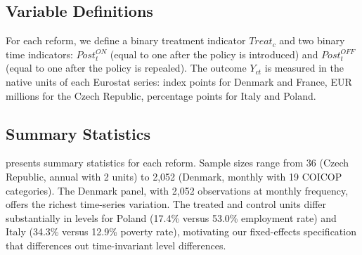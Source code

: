 \documentclass[12pt]{article}
\begin{document}
\subsection{Variable Definitions}

For each reform, we define a binary treatment indicator $Treat_c$ and two binary time indicators: $Post^{ON}_t$ (equal to one after the policy is introduced) and $Post^{OFF}_t$ (equal to one after the policy is repealed). The outcome $Y_{ct}$ is measured in the native units of each Eurostat series: index points for Denmark and France, EUR millions for the Czech Republic, percentage points for Italy and Poland.

\subsection{Summary Statistics}

 presents summary statistics for each reform. Sample sizes range from 36 (Czech Republic, annual with 2 units) to 2,052 (Denmark, monthly with 19 COICOP categories). The Denmark panel, with 2,052 observations at monthly frequency, offers the richest time-series variation. The treated and control units differ substantially in levels for Poland (17.4\% versus 53.0\% employment rate) and Italy (34.3\% versus 12.9\% poverty rate), motivating our fixed-effects specification that differences out time-invariant level differences.
\end{document}
